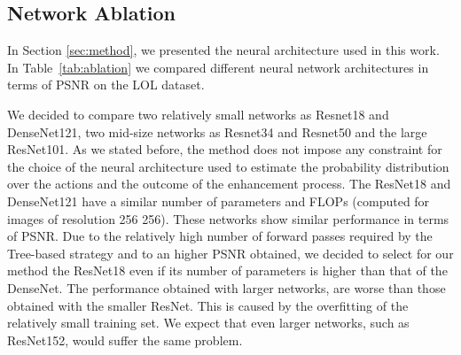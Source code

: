 \documentclass[3p,twocolumn]{elsarticle}
\begin{document}
\subsection{Network Ablation}
In Section \ref{sec:method}, we presented the neural architecture used in this work. In Table~\ref{tab:ablation} we compared different neural network architectures in terms of PSNR on the LOL dataset.

\begin{table}[t]
    \caption{Comparison of different neural architectures on the LOL test set with the Tree-Based inference strategy.}
    \centering
    \label{tab:ablation}
\end{table}

We decided to compare two relatively small networks as Resnet18 and DenseNet121, two mid-size networks as Resnet34 and Resnet50 and the large ResNet101. As we stated before, the method does not impose any constraint for the choice of the neural architecture used to estimate the probability distribution over the actions and the outcome of the enhancement process. The ResNet18 and DenseNet121 have a similar number of parameters and FLOPs (computed for images of resolution 256  256). These networks show similar performance in terms of PSNR. Due to the relatively high number of forward passes required by the Tree-based strategy and to an higher PSNR obtained, we decided to select for our method the ResNet18 even if its number of parameters is higher than that of the DenseNet. The performance obtained with larger networks, are worse than those obtained with the smaller ResNet. This is caused by the overfitting of the relatively small training set.  We expect that even larger networks, such as ResNet152, would suffer the same problem.
\end{document}
